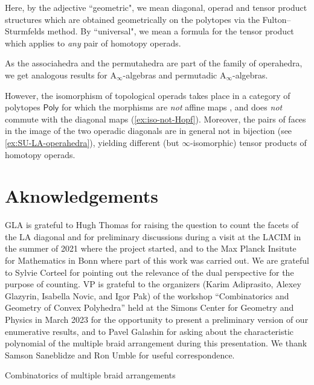 \documentclass{amsart}
\makeatletter
\theoremstyle{definition}
\newcommand{\LA}{\mathrm{LA}}
\newcommand{\PolySub}{\mathsf{Poly}}
\newcommand{\Ainf}{\ensuremath{\mathrm{A}_\infty}}
\def\part{\@startsection{part}{1}%
\z@{.7\linespacing\@plus\linespacing}{.8\linespacing}%
{\LARGE\sffamily\centering}}
\makeatother
\begin{document}
Here, by the adjective ``geometric", we mean diagonal, operad and tensor product structures which are obtained geometrically on the polytopes via the Fulton--Sturmfelds method. 
By ``universal", we mean a formula for the tensor product which applies to \emph{any} pair of homotopy operads.

As the associahedra and the permutahedra are part of the family of operahedra, we get analogous results for $\Ainf$-algebras and permutadic $\Ainf$-algebras. 

However, the isomorphism of topological operads takes place in a category of polytopes $\PolySub$ for which the morphisms are \emph{not} affine maps \cite[Def. 4.13]{LaplanteAnfossi}, and does \emph{not} commute with the diagonal maps (\cref{ex:iso-not-Hopf}).
Moreover, the pairs of faces in the image of the two operadic diagonals are in general not in bijection (see \cref{ex:SU-LA-operahedra}), yielding different (but $\infty$-isomorphic) tensor products of homotopy operads.  


\section*{Aknowledgements}

GLA is grateful to Hugh Thomas for raising the question to count the facets of the $\LA$ diagonal and for preliminary discussions during a visit at the LACIM in the summer of 2021 where the project started, and to the Max Planck Insitute for Mathematics in Bonn where part of this work was carried out.
We are grateful to Sylvie Corteel for pointing out the relevance of the dual perspective for the purpose of counting.
VP is grateful to the organizers (Karim Adiprasito, Alexey Glazyrin, Isabella Novic, and Igor Pak) of the workshop ``Combinatorics and Geometry of Convex Polyhedra'' held at the Simons Center for Geometry and Physics in March 2023 for the opportunity to present a preliminary version of our enumerative results, and to  Pavel Galashin for asking about the characteristic polynomial of the multiple braid arrangement during this presentation.
We thank Samson Saneblidze and Ron Umble for useful correspondence.


\clearpage
\part{Combinatorics of multiple braid arrangements}
\label{part:multiBraidArrangements}
\end{document}
